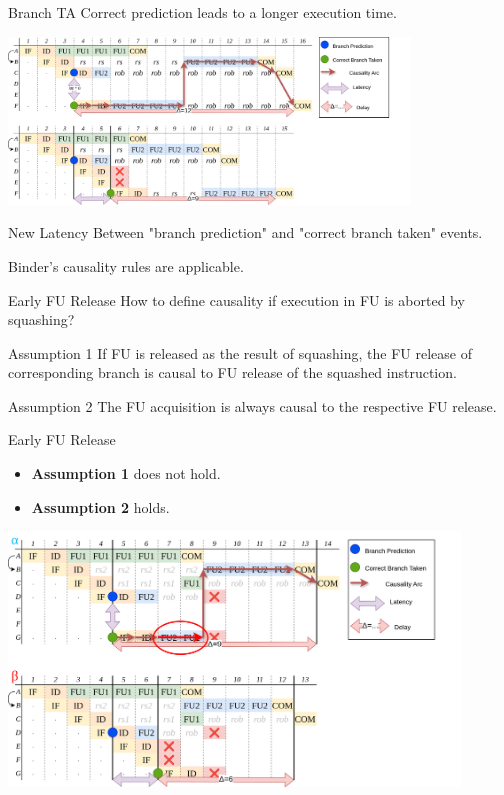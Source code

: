 \documentclass{beamer}
\begin{document}
\begin{frame}{Branch TA}
    Correct prediction leads to a longer execution time.

    \includegraphics[width=0.8\textwidth]{pic/simple-branch-ta-analyzed.png}

    \begin{block}{New Latency}
        Between "branch prediction" and "correct branch taken" events.
    \end{block}

    Binder's causality rules are applicable.
\end{frame}


\begin{frame}{Early FU Release}
    How to define causality if execution in FU is aborted by squashing?

    \begin{block}{Assumption 1}
        If FU is released as the result of squashing, the FU release of corresponding branch is causal to FU release of the squashed instruction.
    \end{block}

    \begin{block}{Assumption 2}
        The FU acquisition is always causal to the respective FU release.
    \end{block}
\end{frame}

\begin{frame}{Early FU Release}
    \begin{itemize}
        \item \textbf{Assumption 1} does not hold.
        \item \textbf{Assumption 2} holds.
    \end{itemize}
    \includegraphics[width=0.9\textwidth]{pic/nested-bp-ta.png}
\end{frame}
\end{document}
